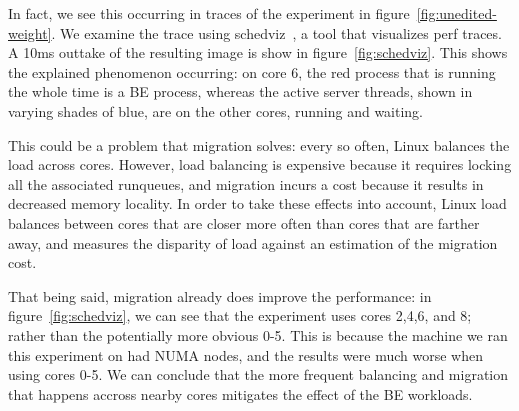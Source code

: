 In fact, we see this occurring in traces of the experiment in
figure~\ref{fig:unedited-weight}. We examine the trace using
schedviz~\cite{schedviz}, a tool that visualizes perf traces. A 10ms outtake of
the resulting image is show in figure~\ref{fig:schedviz}. This shows the
explained phenomenon occurring: on core 6, the red process that is running the
whole time is a BE process, whereas the active server threads, shown in varying
shades of blue, are on the other cores, running and waiting.


This could be a problem that migration solves: every so often, Linux balances
the load across cores. However, load balancing is expensive because it requires
locking all the associated runqueues, and migration incurs a cost because it
results in decreased memory locality. In order to take these effects into
account, Linux load balances between cores that are closer more often than cores
that are farther away, and measures the disparity of load against an estimation
of the migration cost. 

That being said, migration already does improve the performance: in
figure~\ref{fig:schedviz}, we can see that the experiment uses cores 2,4,6, and
8; rather than the potentially more obvious 0-5. This is because the machine we
ran this experiment on had NUMA nodes, and the results were much worse when
using cores 0-5. We can conclude that the
more frequent balancing and migration that happens accross nearby cores
mitigates the effect of the BE workloads.


